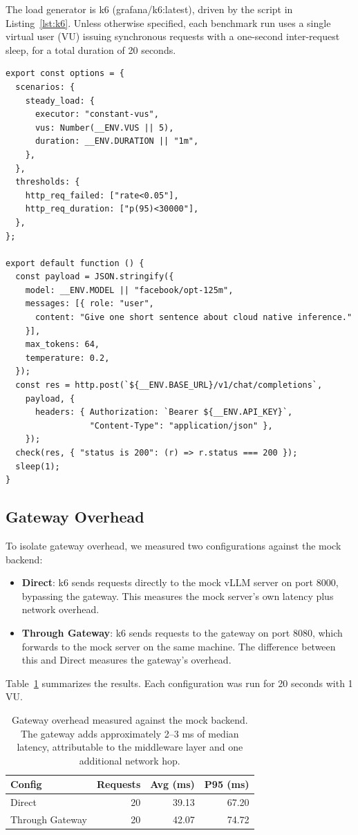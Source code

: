 \documentclass[10pt,journal]{IEEEtran}
\begin{document}
The load generator is k6 (grafana/k6:latest), driven by the script in Listing~\ref{lst:k6}. Unless otherwise specified, each benchmark run uses a single virtual user (VU) issuing synchronous requests with a one-second inter-request sleep, for a total duration of 20 seconds.

\begin{lstlisting}[caption={k6 benchmark script (simplified from \texttt{benchmark/k6-chat.js}).}, label={lst:k6}]
export const options = {
  scenarios: {
    steady_load: {
      executor: "constant-vus",
      vus: Number(__ENV.VUS || 5),
      duration: __ENV.DURATION || "1m",
    },
  },
  thresholds: {
    http_req_failed: ["rate<0.05"],
    http_req_duration: ["p(95)<30000"],
  },
};

export default function () {
  const payload = JSON.stringify({
    model: __ENV.MODEL || "facebook/opt-125m",
    messages: [{ role: "user",
      content: "Give one short sentence about cloud native inference."
    }],
    max_tokens: 64,
    temperature: 0.2,
  });
  const res = http.post(`${__ENV.BASE_URL}/v1/chat/completions`,
    payload, {
      headers: { Authorization: `Bearer ${__ENV.API_KEY}`,
                 "Content-Type": "application/json" },
    });
  check(res, { "status is 200": (r) => r.status === 200 });
  sleep(1);
}
\end{lstlisting}

\subsection{Gateway Overhead}

To isolate gateway overhead, we measured two configurations against the mock backend:

\begin{itemize}
  \item \textbf{Direct}: k6 sends requests directly to the mock vLLM server on port 8000, bypassing the gateway. This measures the mock server's own latency plus network overhead.
  \item \textbf{Through Gateway}: k6 sends requests to the gateway on port 8080, which forwards to the mock server on the same machine. The difference between this and Direct measures the gateway's overhead.
\end{itemize}

Table~\ref{tab:overhead} summarizes the results. Each configuration was run for 20 seconds with 1 VU.

\begin{table}[t]
\centering
\caption{Gateway overhead measured against the mock backend. The gateway adds approximately 2--3 ms of median latency, attributable to the middleware layer and one additional network hop.}
\label{tab:overhead}
\begin{tabular}{lrrr}
\toprule
\textbf{Config} & \textbf{Requests} & \textbf{Avg (ms)} & \textbf{P95 (ms)} \\
\midrule
Direct         & 20 & 39.13  & 67.20 \\
Through Gateway & 20 & 42.07  & 74.72 \\
\bottomrule
\end{tabular}
\end{table}
\end{document}
